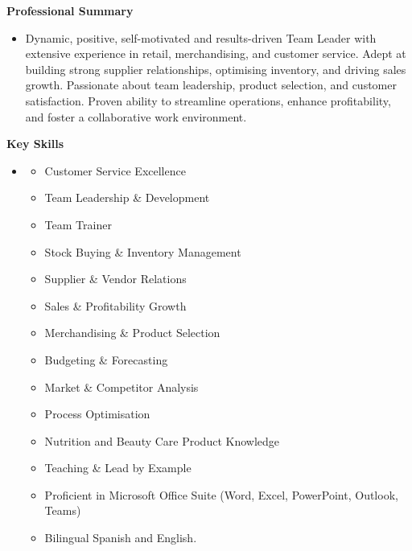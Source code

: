 \documentclass[letterpaper,12pt]{article}[leftmargin=*]
\makeatletter
\def\phoneicon{{\FA\symbol{"F095}}} %
\def \fullname {\begin{tabular}{@{}l@{}}
  {\fontsize{35}{45}\selectfont\textbf{\color{primary}Valeria}} \\[-16pt]
  {\fontsize{35}{45}\selectfont\color{primary}Kierbel}
\end{tabular}}
\def \subtitle {}
\def \phoneicon {\faPhone}
\def \phonetext {+44 7856 694 592}
\def \emailicon {\faEnvelope}
\def \emaillink {mailto:valereea@gmail.com}
\def \emailtext {valereea@gmail.com}
\def \headertype {\doublecol} %
\def \entryspacing {-0pt}
\def \phone {\phoneicon \hspace{3pt}{ \phonetext}}
\def \email {\emailicon \hspace{3pt}\href{\emaillink}{\emailtext}}
\renewcommand{\section}[2]{\vspace{5pt}
  \colorbox{secondary}{\color{white}\raggedbottom\normalsize\textbf{{#1}{\hspace{7pt}#2}}}
}
\newcommand{\resumeEntryStart}{\begin{itemize}[leftmargin=2.5mm]}
\newcommand{\resumeEntryEnd}{\end{itemize}\vspace{\entryspacing}}
\newcommand{\resumeItemListStart}{\begin{itemize}[leftmargin=*,itemsep=0pt]}
\newcommand{\resumeItemListEnd}{\end{itemize}}
\newcommand{\resumeItem}[1]{
  \item\small{
    {#1 \vspace{-2pt}}
  }
}
\newcommand{\resumeEntryS}[2]{
  \item[]\small{
    \textbf{\color{primary}#1 }{ #2 \vspace{-6pt}}
  }
}
\newcommand{\doublecol}[6]{
  \begin{tabularx}{\textwidth}{Xr}
    {
      \begin{tabular}[c]{l}
        \fontsize{35}{45}\selectfont{\color{primary}{{\textbf{\fullname}}}} \\
        {\textit{\subtitle}} %
      \end{tabular}
    } & {
      \begin{tabular}[c]{l@{\hspace{1.5em}}l}
        {\small#4} & {\small#1} \\
        {\small#5} & {\small#2} \\
        {\small#6} & {\small#3}
      \end{tabular}
    }
  \end{tabularx}
}
\newcommand{\singlecol}[6]{
  \begin{tabularx}{\textwidth}{Xr}
    {
      \begin{tabular}[b]{l}
        \fontsize{35}{45}\selectfont{\color{primary}{{\textbf{\fullname}}}} \\
        {\textit{\subtitle}} %
        \\[\vspace{8pt}] %
        {\small#1} \\
        {\small#2} \\
        {\small#3} \\
        {\small#4} \\
        {\small#5} \\
        {\small#6}
      \end{tabular}
    }
  \end{tabularx}
}
\makeatother
\begin{document}


\headertype{\email}{}{}{\phone}{}{} %
\vspace{-10pt} %

\section{}{Professional Summary}

  \resumeEntryStart
    \resumeEntryS{}
      {Dynamic, positive, self-motivated and results-driven Team Leader with extensive experience in retail, merchandising, and customer service. Adept at building strong supplier relationships, optimising inventory, and driving sales growth. Passionate about team leadership, product selection, and customer satisfaction. Proven ability to streamline operations, enhance profitability, and foster a collaborative work environment.}
  \resumeEntryEnd

\section{}{Key Skills}
 \resumeEntryStart
    \resumeEntryS{ }{ }
    \vspace{-20pt}
    \resumeItemListStart
        \resumeItem{Customer Service Excellence}
        \resumeItem{Team Leadership \& Development}
        \resumeItem{Team Trainer}
        \resumeItem{Stock Buying \& Inventory Management}
        \resumeItem{Supplier \& Vendor Relations}
        \resumeItem{Sales \& Profitability Growth}
        \resumeItem{Merchandising \& Product Selection}
        \resumeItem{Budgeting \& Forecasting}
        \resumeItem{Market \& Competitor Analysis}
        \resumeItem{Process Optimisation}
        \resumeItem{Nutrition and Beauty Care Product Knowledge}
        \resumeItem{Teaching \& Lead by Example}
        \resumeItem{Proficient in Microsoft Office Suite (Word, Excel, PowerPoint, Outlook, Teams)}
        \resumeItem{Bilingual Spanish and English.}
    \resumeItemListEnd
 \resumeEntryEnd
\end{document}
